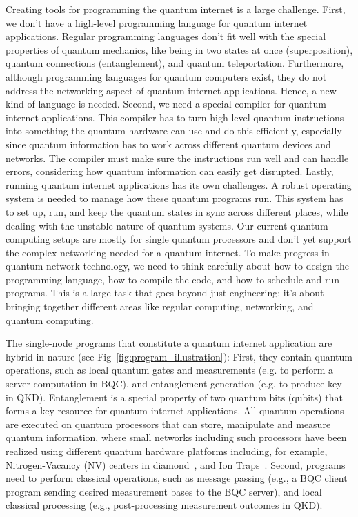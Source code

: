 Creating tools for programming the quantum internet is a large challenge.
First, we don't have a high-level programming language for quantum internet applications.
Regular programming languages don't fit well with the special properties of quantum mechanics, like being in two states at once (superposition), quantum connections (entanglement), and quantum teleportation. Furthermore, although programming languages for quantum computers exist, they do not address the networking aspect of quantum internet applications.
Hence, a new kind of language is needed.
Second, we need a special compiler for quantum internet applications.
This compiler has to turn high-level quantum instructions into something the quantum hardware can use and do this efficiently, especially since quantum information has to work across different quantum devices and networks.
The compiler must make sure the instructions run well and can handle errors, considering how quantum information can easily get disrupted.
Lastly, running quantum internet applications has its own challenges.
A robust operating system is needed to manage how these quantum programs run.
This system has to set up, run, and keep the quantum states in sync across different places, while dealing with the unstable nature of quantum systems.
Our current quantum computing setups are mostly for single quantum processors and don't yet support the complex networking needed for a quantum internet.
To make progress in quantum network technology, we need to think carefully about how to design the programming language, how to compile the code, and how to schedule and run programs.
This is a large task that goes beyond just engineering; it's about bringing together different areas like regular computing, networking, and quantum computing.




The single-node programs that constitute a quantum internet application are hybrid in nature (see Fig~\ref{fig:program_illustration}):
First, they contain quantum operations, such as local quantum gates and measurements (e.g. to perform a server computation in BQC), and entanglement generation (e.g. to produce key in QKD). Entanglement is a special property of two quantum bits (qubits) that forms a key resource for quantum internet applications. 
All quantum operations are executed on quantum processors that can store, manipulate and measure quantum information, where small networks including such processors have been realized using different quantum hardware platforms including, for example,  Nitrogen-Vacancy (NV) centers in diamond~\cite{pompili2021realization}, and Ion Traps~\cite{krutyanskiy2023entanglement}.
Second, programs need to perform classical operations, such as message passing (e.g., a BQC client program sending desired measurement bases to the BQC server), and local classical processing (e.g., post-processing measurement outcomes in QKD).

